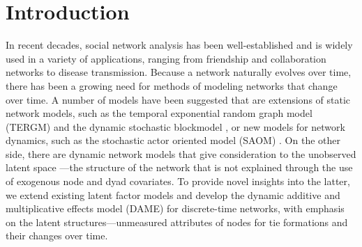\documentclass[a4paper]{article}
\begin{document}
	\section{Introduction} \label{sec: Introduction}
	In recent decades, social network analysis has been well-established and is widely used in a variety of applications, ranging from friendship and collaboration networks to disease transmission.  Because a network naturally evolves over time, there has been a growing need for methods of modeling networks that change over time. A number of models have been suggested that are extensions of static network models, such as the temporal exponential random graph model (TERGM) \citep{hanneke2010discrete} and the dynamic stochastic blockmodel \citep{xu2013dynamic}, or new models for network dynamics, such as the stochastic actor oriented model (SAOM) \citep{snijders2010introduction}. On the other side, there are dynamic network models that give consideration to the unobserved latent space \citep{hoff2002latent}---the structure of the network that is not explained through the use of exogenous node and dyad covariates. To provide novel insights into the latter, we extend existing latent factor models \citep{hoff2005bilinear,hoff2009multiplicative,hoff2014amen,minhas2016inferential} and develop the dynamic additive and multiplicative effects model (DAME) for discrete-time networks, with emphasis on the latent structures---unmeasured attributes of nodes for tie formations and their changes over time.\\ \newline
\end{document}
